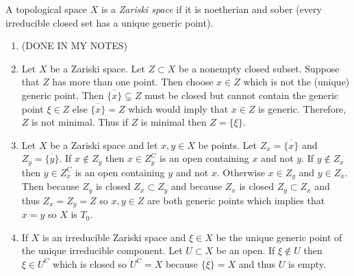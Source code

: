 \documentclass[12pt]{article}
\begin{document}
A topological space $X$ is a \textit{Zariski space} if it is noetherian and sober (every irreducible closed set has a unique generic point).

\begin{enumerate}
\item (DONE IN MY NOTES)

\item Let $X$ be a Zariski space. Let $Z \subset X$ be a nonempty closed subset. Suppose that $Z$ has more than one point. Then choose $x \in Z$ which is not the (unique) generic point. Then $\overline{ \{ x \} } \subsetneq Z$ must be closed but cannot contain the generic point $\xi \in Z$ else $\overline{\{ x \}} = Z$ which would imply that $x \in Z$ is generic. Therefore, $Z$ is not minimal. Thus if $Z$ is minimal then $Z = \{ \xi \}$.

\item Let $X$ be a Zariski space and let $x, y \in X$ be points. Let $Z_x = \overline{ \{ x \} }$ and $Z_y = \overline{ \{ y \} }$. If $x \notin Z_y$ then $x \in Z_y^C$ is an open containing $x$ and not $y$. If $y \notin Z_x$ then $y \in Z_x^C$ is an open containing $y$ and not $x$. Otherwise $x \in Z_y$ and $y \in Z_x$. Then because $Z_y$ is closed $Z_x \subset Z_y$ and because $Z_x$ is closed $Z_y \subset Z_x$ and thus $Z_x = Z_y = Z$ so $x, y \in Z$ are both generic points which implies that $x = y$ so $X$ is $T_0$.

\item If $X$ is an irreducible Zariski space and $\xi \in X$ be the unique generic point of the unique irreducible component. Let $U \subset X$ be an open. If $\xi \notin U$ then $\xi \in U^C$ which is closed so $U^C = X$ because $\overline{ \{ \xi \} } = X$ and thus $U$ is empty.


\end{enumerate}
\end{document}
